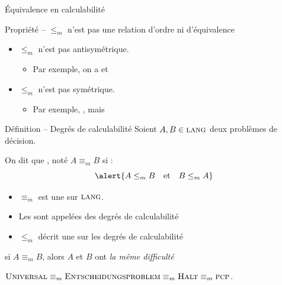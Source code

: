 
\begingroup

\begin{frame}{Équivalence en calculabilité}

  \vspace{-2mm}
  \begin{block}{Propriété -- $\leq_m$ n'est pas une relation d'ordre ni d'équivalence}
    \begin{itemize}
    \item $\leq_m$ n'est pas antisymétrique. 
      \begin{itemize}
      \item Par exemple, on a  et 
      \end{itemize}
    \item $\leq_m$ n'est pas symétrique. 
      \begin{itemize}
      \item Par exemple, , mais 
      \end{itemize}
    \end{itemize}
  \end{block}

  \vspace{-2mm}
  \begin{block}{Définition -- Degrés de calculabilité}
    Soient $A, B \in \textsc{lang}$ deux problèmes de décision.
    
    On dit que , noté \alert{$A \equiv_m B$} si :
    $$\alert{A \leq_m B \quad \text{et} \quad B \leq_m A}$$
  \end{block}

  \begin{itemize}
    \item \vspace{-2mm} $\equiv_m$ est une  sur $\textsc{lang}$.
    \item Les  sont appelées des \alert{degrés de calculabilité}
    \item $\leq_m$ décrit une  sur les degrés de calculabilité
  \end{itemize}

  \vspace{2mm}
   si $A \equiv_m B$, alors $A$ et $B$ ont \og \emph{la même difficulté} \fg

  \vspace{2mm}
  $\textsc{Universal} \equiv_m \textsc{Entscheidungsproblem}\equiv_m  \textsc{Halt} \equiv_m \textsc{pcp}$. 

\end{frame}

\endgroup
\endinput
